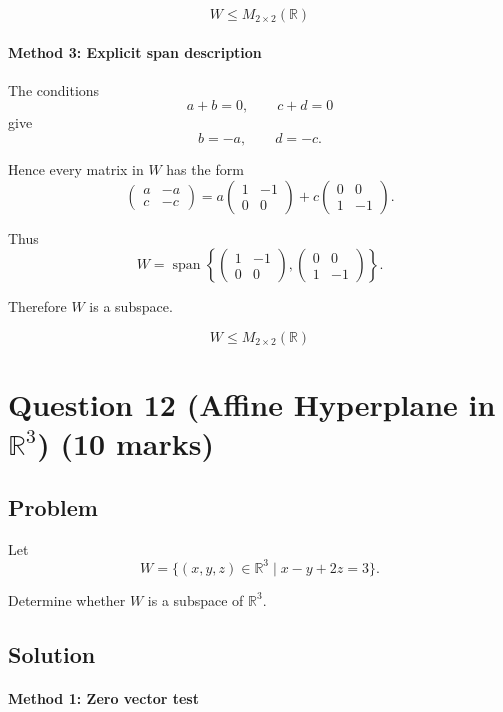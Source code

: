 \documentclass[12pt]{article}
\newcommand{\Span}{\operatorname{span}}
\begin{document}
\[
\boxed{W\le M_{2\times2}(\mathbb R)}
\]

\paragraph{Method 3: Explicit span description}

The conditions
\[
a+b=0,\qquad c+d=0
\]
give
\[
b=-a,\qquad d=-c.
\]

Hence every matrix in \(W\) has the form
\[
\begin{pmatrix}
a & -a\\
c & -c
\end{pmatrix}
=
a\begin{pmatrix}
1 & -1\\
0 & 0
\end{pmatrix}
+
c\begin{pmatrix}
0 & 0\\
1 & -1
\end{pmatrix}.
\]

Thus
\[
W=\Span\left\{
\begin{pmatrix}
1 & -1\\
0 & 0
\end{pmatrix},
\begin{pmatrix}
0 & 0\\
1 & -1
\end{pmatrix}
\right\}.
\]

Therefore \(W\) is a subspace.

\[
\boxed{W\le M_{2\times2}(\mathbb R)}
\]

\newpage
\section{Question 12 (Affine Hyperplane in \(\mathbb R^3\)) \hfill (10 marks)}
\subsection{Problem}

Let
\[
W=\{(x,y,z)\in\mathbb R^3\mid x-y+2z=3\}.
\]

Determine whether \(W\) is a subspace of \(\mathbb R^3\).

\subsection{Solution}

\paragraph{Method 1: Zero vector test}
\end{document}
